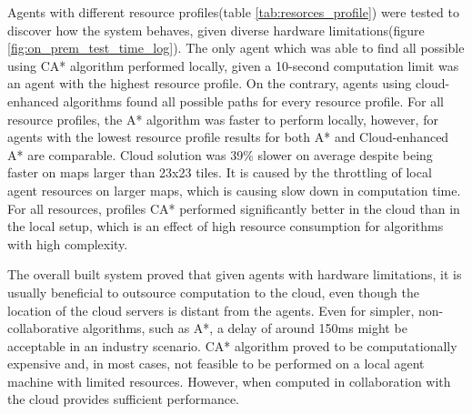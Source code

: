 Agents with different resource profiles(table \ref{tab:resorces_profile}) were tested to discover how the system behaves, given diverse hardware limitations(figure \ref{fig:on_prem_test_time_log}). The only agent which was able to find all possible using CA* algorithm performed locally, given a 10-second computation limit was an agent with the highest resource profile. On the contrary, agents using cloud-enhanced algorithms found all possible paths for every resource profile. For all resource profiles, the A* algorithm was faster to perform locally, however, for agents with the lowest resource profile results for both A* and Cloud-enhanced A* are comparable. Cloud  solution was 39\% slower on average despite being faster on maps larger than 23x23 tiles. It is caused by the throttling of local agent resources on larger maps, which is causing slow down in computation time. For all resources, profiles CA* performed significantly better in the cloud than in the local setup, which is an effect of high resource consumption for algorithms with high complexity.

The overall built system proved that given agents with hardware limitations, it is usually beneficial to outsource computation to the cloud, even though the location of the cloud servers is distant from the agents. Even for simpler, non-collaborative algorithms, such as A*, a delay of around 150ms might be acceptable in an industry scenario. CA* algorithm proved to be computationally expensive and, in most cases, not feasible to be performed on a local agent machine with limited resources. However, when computed in collaboration with the cloud provides sufficient performance.
